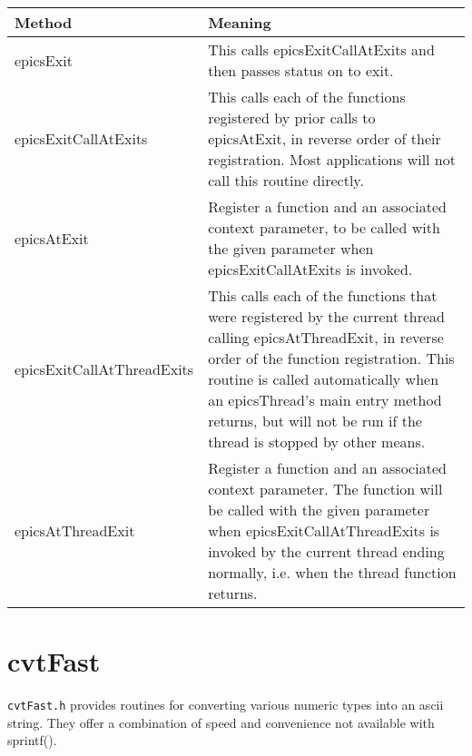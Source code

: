 \begin{center}
\begin{longtable}{p{2.0in}p{4.4in}}
\textbf{Method} & \textbf{Meaning}\\
\hline
epicsExit & This calls epicsExitCallAtExits and then passes status on to exit.\\
epicsExitCallAtExits & This calls each of the functions registered by prior calls to epicsAtExit, in reverse order of their registration.  Most applications will not call this routine directly.\\
epicsAtExit & Register a function and an associated context parameter, to be called with the given parameter when epicsExitCallAtExits is invoked.\\
epicsExitCallAtThreadExits & This calls each of the functions that were registered by the current thread calling epicsAtThreadExit, in reverse order of the function registration.  This routine is called automatically when an epicsThread's main entry method returns, but will not be run if the thread is stopped by other means.\\
epicsAtThreadExit & Register a function and an associated context parameter. The function will be called with the given parameter when epicsExitCallAtThreadExits is invoked by the current thread ending normally, i.e. when the thread function returns.
\end{longtable}

\end{center}


\section{cvtFast}

\verb|cvtFast.h| provides routines for converting various numeric types into an ascii string.
They offer a combination of speed and convenience not available with sprintf().

